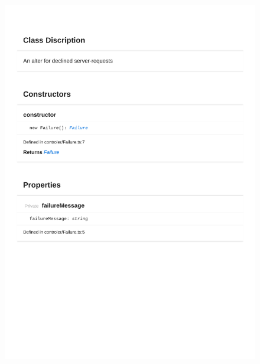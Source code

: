 \begin{figure}[H]
\centerline{\includegraphics[width=\textwidth]{FrontendDocsAsPDF/Model/Failure.pdf}}
\end{figure}

